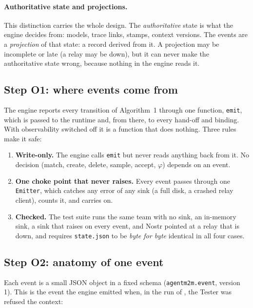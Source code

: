 \documentclass[10pt,a4paper]{article}
\newcommand{\code}[1]{\texttt{#1}}
\newcommand{\file}[1]{\texttt{#1}}
\theoremstyle{definition}
\begin{document}
\paragraph{Authoritative state and projections.} This distinction carries the
whole design. The \emph{authoritative} state is what the engine decides
from: models, trace links, stamps, context versions. The events are a
\emph{projection} of that state: a record derived from it. A projection may
be incomplete or late (a relay may be down), but it can never make the
authoritative state wrong, because nothing in the engine reads it.

\subsection{Step O1: where events come from}

The engine reports every transition of Algorithm~1 through one function,
\code{emit}, which is passed to the runtime and, from there, to every
hand-off and binding. With observability switched off it is a function that
does nothing. Three rules make it safe:

\begin{enumerate}[nosep]
\item \textbf{Write-only.} The engine calls \code{emit} but never reads
anything back from it. No decision (match, create, delete, sample, accept,
$\varphi$) depends on an event.
\item \textbf{One choke point that never raises.} Every event passes through
one \code{Emitter}, which catches any error of any sink (a full disk, a
crashed relay client), counts it, and carries on.
\item \textbf{Checked.} The test suite runs the same team with no sink, an
in-memory sink, a sink that raises on every event, and Nostr pointed at a
relay that is down, and requires \file{state.json} to be \emph{byte for byte}
identical in all four cases.
\end{enumerate}

\subsection{Step O2: anatomy of one event}

Each event is a small JSON object in a fixed schema (\code{agentm2m.event},
version 1). This is the event the engine emitted when, in the run of
, the Tester was refused the context:
\end{document}
